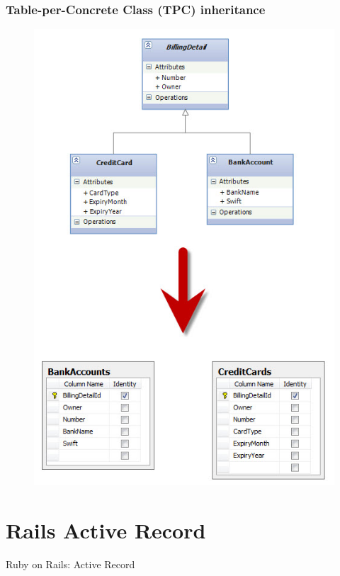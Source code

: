 \documentclass{beamer}
\begin{document}
\begin{frame}
	\frametitle{Table-per-Concrete Class (TPC) inheritance}
	\begin{figure}
		\centering
		\includegraphics[scale=0.28]{resources/entity-framework/tpc.png}
	\end{figure}
\end{frame}

\section{Rails Active Record}

\begin{frame}
	
	\begin{center}
		\Huge Ruby on Rails: Active Record
	\end{center}

\end{frame}
\end{document}
